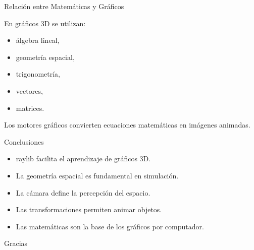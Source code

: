 \documentclass{beamer}
\begin{document}
\begin{frame}{Relación entre Matemáticas y Gráficos}

En gráficos 3D se utilizan:

\begin{itemize}
    \item álgebra lineal,
    \item geometría espacial,
    \item trigonometría,
    \item vectores,
    \item matrices.
\end{itemize}

\vspace{0.4cm}

Los motores gráficos convierten ecuaciones matemáticas en imágenes animadas.

\end{frame}

\begin{frame}{Conclusiones}

\begin{itemize}
    \item raylib facilita el aprendizaje de gráficos 3D.
    \item La geometría espacial es fundamental en simulación.
    \item La cámara define la percepción del espacio.
    \item Las transformaciones permiten animar objetos.
    \item Las matemáticas son la base de los gráficos por computador.
\end{itemize}

\end{frame}

\begin{frame}
\centering
\Huge
Gracias
\end{frame}
\end{document}
